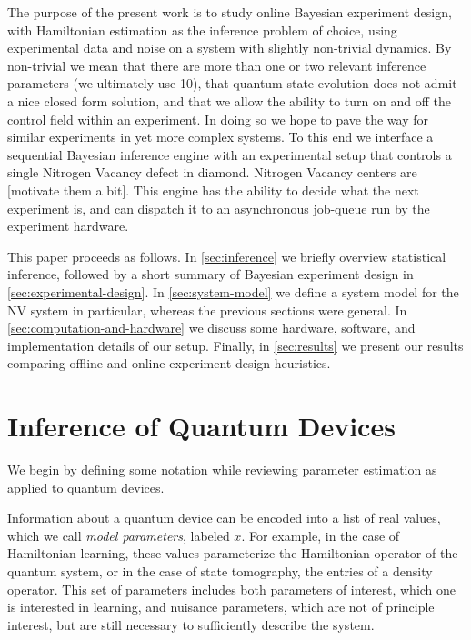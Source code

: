 \documentclass[aps,nofootinbib,twocolumn,superscriptaddress]{revtex4}
\newcommand{\mps}{x}
\begin{document}
The purpose of the present work is to study
online Bayesian experiment design, with Hamiltonian estimation
as the inference problem of choice, using experimental data and noise on
a system with slightly non-trivial dynamics.
By non-trivial we mean that there are more than one or two
relevant inference parameters (we ultimately use 10), that
quantum state evolution does not admit a nice closed form
solution, and that we allow the ability to turn
on and off the control field within an experiment.
In doing so we hope to pave the way for similar experiments in
yet more complex systems.
To this end we interface a sequential Bayesian inference engine with
an experimental setup that controls a single Nitrogen
Vacancy defect in diamond.
Nitrogen Vacancy centers are [\TODO motivate them a bit].
This engine has the ability to decide what the next experiment
is, and can dispatch it to an asynchronous job-queue run by
the experiment hardware.

This paper proceeds as follows.
In \autoref{sec:inference} we briefly overview statistical
inference, followed by a short summary of Bayesian experiment
design in \autoref{sec:experimental-design}.
In \autoref{sec:system-model} we define a system model for
the NV system in particular, whereas the previous sections
were general.
In \autoref{sec:computation-and-hardware} we discuss some
hardware, software, and implementation details of our setup.
Finally, in \autoref{sec:results} we present our results
comparing offline and online experiment design heuristics.



\section{Inference of Quantum Devices}
\label{sec:inference}

We begin by defining some notation while reviewing parameter
estimation as applied to quantum devices.

Information about a quantum device can be encoded into a list of
real values, which we call \textit{model parameters}, labeled $\mps$.
For example, in the case of Hamiltonian learning,
these values parameterize the Hamiltonian operator of the
quantum system, or in the case of
state tomography, the entries of a density operator.
This set of parameters includes both parameters of interest, which
one is interested in learning, and nuisance parameters, which are
not of principle interest, but are still necessary to sufficiently
describe the system.
\end{document}
